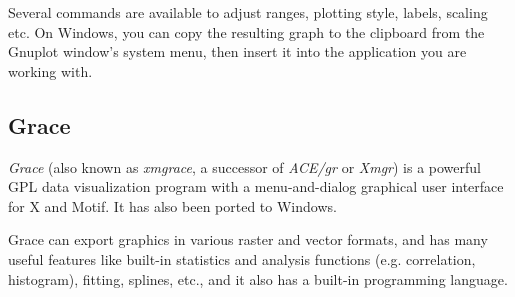 Several commands are available to adjust ranges, plotting style, labels,
scaling etc. On Windows, you can copy the resulting graph to the clipboard from
the Gnuplot window's system menu, then insert it into the application you
are working with.


\subsection{Grace}

\textit{Grace} (also known as \textit{xmgrace}, a successor of
\textit{ACE/gr} or \textit{Xmgr}) is a powerful GPL data visualization
program with a menu-and-dialog graphical user interface for X and Motif. It
has also been ported to Windows.

Grace can export graphics in various raster and vector formats, and has
many useful features like built-in statistics and analysis functions (e.g.
correlation, histogram), fitting, splines, etc., and it also has a built-in
programming language.




